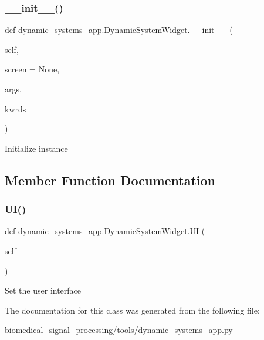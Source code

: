 \subsubsection{\texorpdfstring{\+\_\+\+\_\+init\+\_\+\+\_\+()}{\_\_init\_\_()}}
{\footnotesize\ttfamily def dynamic\+\_\+systems\+\_\+app.\+Dynamic\+System\+Widget.\+\_\+\+\_\+init\+\_\+\+\_\+ (\begin{DoxyParamCaption}\item[{}]{self,  }\item[{}]{screen = {\ttfamily None},  }\item[{}]{args,  }\item[{}]{kwrds }\end{DoxyParamCaption})}

\begin{DoxyVerb}Initialize instance
\end{DoxyVerb}
 

\subsection{Member Function Documentation}
\mbox{\label{classdynamic__systems__app_1_1DynamicSystemWidget_a4a9ba786a3c93fac5257c0dc2c984e43}} 
\subsubsection{\texorpdfstring{U\+I()}{UI()}}
{\footnotesize\ttfamily def dynamic\+\_\+systems\+\_\+app.\+Dynamic\+System\+Widget.\+UI (\begin{DoxyParamCaption}\item[{}]{self }\end{DoxyParamCaption})}

\begin{DoxyVerb}Set the user interface
\end{DoxyVerb}
 

The documentation for this class was generated from the following file\+:\begin{DoxyCompactItemize}
\item 
biomedical\+\_\+signal\+\_\+processing/tools/\hyperlink{dynamic__systems__app_8py}{dynamic\+\_\+systems\+\_\+app.\+py}\end{DoxyCompactItemize}

